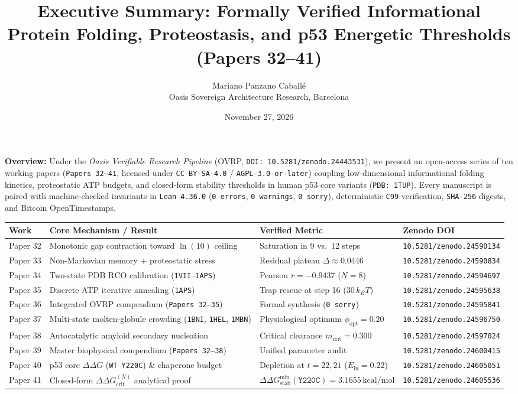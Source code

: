 \documentclass[11pt,a4paper]{article}
\title{Executive Summary: Formally Verified Informational Protein Folding, Proteostasis, and p53 Energetic Thresholds (Papers 32--41)}
\author{Mariano Panzano Caball\'e \\ \small Oasis Sovereign Architecture Research, Barcelona}
\date{November 27, 2026}
\begin{document}
\maketitle

\noindent\textbf{Overview:}
Under the \emph{Oasis Verifiable Research Pipeline} (OVRP, \texttt{DOI: 10.5281/zenodo.24443531}), we present an open-access series of ten working papers (\texttt{Papers 32--41}, licensed under \texttt{CC-BY-SA-4.0} / \texttt{AGPL-3.0-or-later}) coupling low-dimensional informational folding kinetics, proteostatic ATP budgets, and closed-form stability thresholds in human p53 core variants (\texttt{PDB: 1TUP}). Every manuscript is paired with machine-checked invariants in \texttt{Lean~4.36.0} (\texttt{0~errors}, \texttt{0~warnings}, \texttt{0~sorry}), deterministic \texttt{C99} verification, \texttt{SHA-256} digests, and Bitcoin OpenTimestamps.

\vspace{6pt}
\begin{center}
\small
\begin{tabular}{llll}
\toprule
\textbf{Work} & \textbf{Core Mechanism / Result} & \textbf{Verified Metric} & \textbf{Zenodo DOI} \\
\midrule
Paper 32 & Monotonic gap contraction toward $\ln(10)$ ceiling & Saturation in 9 vs.\ 12 steps & \texttt{10.5281/zenodo.24590134} \\
Paper 33 & Non-Markovian memory + proteostatic stress & Residual plateau $\Delta \approx 0.0446$ & \texttt{10.5281/zenodo.24590834} \\
Paper 34 & Two-state PDB $\mathrm{RCO}$ calibration (\texttt{1VII}--\texttt{1APS}) & Pearson $r = -0.9437$ ($N=8$) & \texttt{10.5281/zenodo.24594697} \\
Paper 35 & Discrete ATP iterative annealing (\texttt{1APS}) & Trap rescue at step 16 ($30\,k_B T$) & \texttt{10.5281/zenodo.24595638} \\
Paper 36 & Integrated OVRP compendium (\texttt{Papers 32--35}) & Formal synthesis (\texttt{0 sorry}) & \texttt{10.5281/zenodo.24595841} \\
Paper 37 & Multi-state molten-globule crowding (\texttt{1BNI}, \texttt{1HEL}, \texttt{1MBN}) & Physiological optimum $\phi_{\mathrm{opt}} = 0.20$ & \texttt{10.5281/zenodo.24596750} \\
Paper 38 & Autocatalytic amyloid secondary nucleation & Critical clearance $m_{\mathrm{crit}} = 0.300$ & \texttt{10.5281/zenodo.24597024} \\
Paper 39 & Master biophysical compendium (\texttt{Papers 32--38}) & Unified parameter audit & \texttt{10.5281/zenodo.24600415} \\
Paper 40 & p53 core $\Delta\Delta G$ (\texttt{WT}--\texttt{Y220C}) \& chaperone budget & Depletion at $t=22, 21$ ($E_{\mathrm{in}}=0.22$) & \texttt{10.5281/zenodo.24605051} \\
Paper 41 & Closed-form $\Delta\Delta G_{\mathrm{crit}}^{(N)}$ analytical proof & $\Delta\Delta G_{\mathrm{stab}}^{\min}(\texttt{Y220C}) = 3.1655\,\mathrm{kcal/mol}$ & \texttt{10.5281/zenodo.24605536} \\
\bottomrule
\end{tabular}
\end{center}
\end{document}
